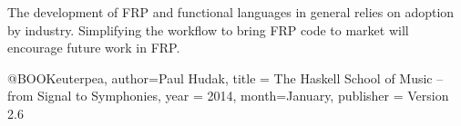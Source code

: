\documentclass[preprint]{sigplanconf}
\begin{document}
The development of FRP and functional languages in general relies on adoption by industry.
Simplifying the workflow to bring FRP code to market will encourage future work in FRP.





\begin{thebibliography}{}
\softraggedright


@BOOK{euterpea,
  author={Paul Hudak},
  title = {The Haskell School of Music -- from Signal to Symphonies},
  year = {2014},
  month={January},
  publisher = {Version 2.6}
  }

\end{thebibliography}
\end{document}
